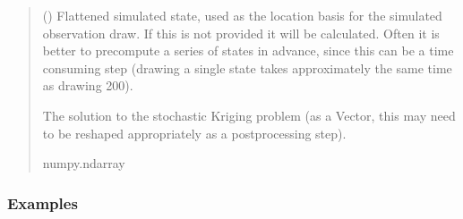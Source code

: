 \documentclass[letterpaper,10pt,english]{sphinxmanual}
\begin{document}
\begin{fulllineitems}
\begin{fulllineitems}
\begin{itemize}
\end{itemize}
\begin{quote}\begin{description}
\sphinxAtStartPar
{} (\sphinxstyleliteralemphasis{\sphinxupquote{ | }}) \textendash{} Flattened simulated state, used as the location basis for the
simulated observation draw. If this is not provided it will be
calculated. Often it is better to pre\sphinxhyphen{}compute a series of states in
advance, since this can be a time consuming step (drawing a single
state takes approximately the same time as drawing 200).

\sphinxAtStartPar
The solution to the stochastic Kriging problem (as a Vector, this
may need to be re\sphinxhyphen{}shaped appropriately as a post\sphinxhyphen{}processing step).

\sphinxAtStartPar
numpy.ndarray

\end{description}\end{quote}
\subsubsection*{Examples}

\begin{sphinxVerbatim}[commandchars=\\\{\}]
  
  
\end{sphinxVerbatim}

\end{fulllineitems}


\end{fulllineitems}

\end{document}
